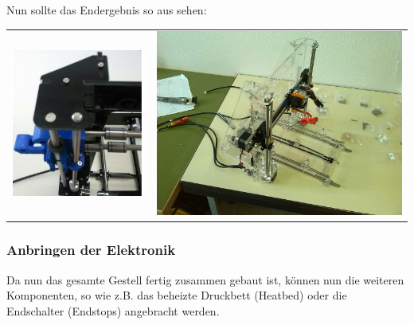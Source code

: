 Nun sollte das Endergebnis so aus sehen:\\
\begin{tabular}{cc}
\includegraphics[clip=true, trim= 0 0 30 0, height=0.55\linewidth]{Bilder/Z_Assembly_6.png} & 
\includegraphics[clip=true, trim= 200 0 150 0, height=0.55\linewidth]{Bilder/XYZ_Merge_1.jpg} \\
\end{tabular}

\subsubsection{Anbringen der Elektronik}
Da nun das gesamte Gestell fertig zusammen gebaut ist, können nun die weiteren Komponenten, so wie z.B. das beheizte Druckbett (Heatbed) oder die Endschalter (Endstops) angebracht werden.

